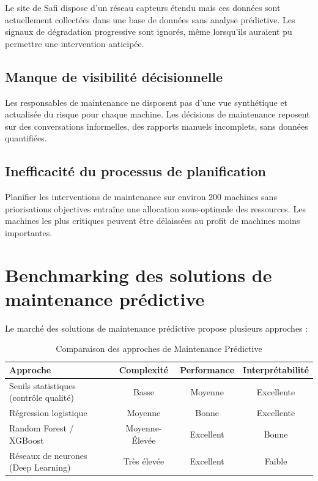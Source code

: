 \documentclass[a4paper,12pt,twoside]{report}
\begin{document}
Le site de Safi dispose d'un réseau capteurs étendu mais ces données sont actuellement collectées dans une base de données sans analyse prédictive. Les signaux de dégradation progressive sont ignorés, même lorsqu'ils auraient pu permettre une intervention anticipée.

\subsection{Manque de visibilité décisionnelle}

Les responsables de maintenance ne disposent pas d'une vue synthétique et actualisée du risque pour chaque machine. Les décisions de maintenance reposent sur des conversations informelles, des rapports manuels incomplets, sans données quantifiées.

\subsection{Inefficacité du processus de planification}

Planifier les interventions de maintenance sur environ 200 machines sans priorisations objectives entraîne une allocation sous-optimale des ressources. Les machines les plus critiques peuvent être délaissées au profit de machines moins importantes.

\section{Benchmarking des solutions de maintenance prédictive}

Le marché des solutions de maintenance prédictive propose plusieurs approches :

\begin{table}[H]
\centering
\small
\caption{Comparaison des approches de Maintenance Prédictive}
\begin{tabular}{|l|c|c|c|}
\hline
\textbf{Approche} & \textbf{Complexité} & \textbf{Performance} & \textbf{Interprétabilité} \\
\hline\hline
Seuils statistiques (contrôle qualité) & Basse & Moyenne & Excellente \\
\hline
Régression logistique & Moyenne & Bonne & Excellente \\
\hline
Random Forest / XGBoost & Moyenne-Élevée & Excellent & Bonne \\
\hline
Réseaux de neurones (Deep Learning) & Très élevée & Excellent & Faible \\
\hline
\end{tabular}
\end{table}
\end{document}
